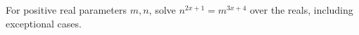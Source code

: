 For positive real parameters $m,n$, solve $n^{2x+1}=m^{3x+4}$ over the reals, including exceptional cases.
